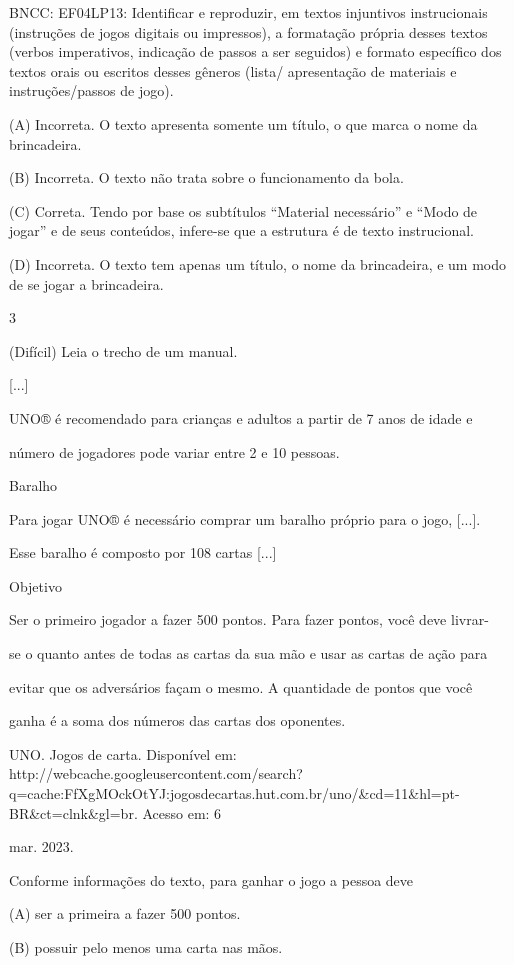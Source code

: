 \begin{itemize}
{{{\begin{itemize}
BNCC: EF04LP13: Identificar e reproduzir, em textos injuntivos
instrucionais (instruções de jogos digitais ou impressos), a formatação
própria desses textos (verbos imperativos, indicação de passos a ser
seguidos) e formato específico dos textos orais ou escritos desses
gêneros (lista/ apresentação de materiais e instruções/passos de jogo).

(A) Incorreta. O texto apresenta somente um título, o que marca o nome
da brincadeira.

(B) Incorreta. O texto não trata sobre o funcionamento da bola.

(C) Correta. Tendo por base os subtítulos ``Material necessário'' e
``Modo de jogar'' e de seus conteúdos, infere-se que a estrutura é de
texto instrucional.

(D) Incorreta. O texto tem apenas um título, o nome da brincadeira, e um
modo de se jogar a brincadeira.

\num{3}

(Difícil) Leia o trecho de um manual.

{[}...{]}

UNO® é recomendado para crianças e adultos a partir de 7 anos de idade e

número de jogadores pode variar entre 2 e 10 pessoas.

Baralho

Para jogar UNO® é necessário comprar um baralho próprio para o jogo,
{[}...{]}.

Esse baralho é composto por 108 cartas {[}...{]}

Objetivo

Ser o primeiro jogador a fazer 500 pontos. Para fazer pontos, você deve
livrar-

se o quanto antes de todas as cartas da sua mão e usar as cartas de ação
para

evitar que os adversários façam o mesmo. A quantidade de pontos que você

ganha é a soma dos números das cartas dos oponentes.

UNO. Jogos de carta. Disponível em:
http://webcache.googleusercontent.com/search?q=cache:FfXgMOckOtYJ:jogosdecartas.hut.com.br/uno/\&cd=11\&hl=pt-BR\&ct=clnk\&gl=br.
Acesso em: 6

mar. 2023.

Conforme informações do texto, para ganhar o jogo a pessoa deve

(A) ser a primeira a fazer 500 pontos.

(B) possuir pelo menos uma carta nas mãos.


\end{itemize}}}}
\end{itemize}
